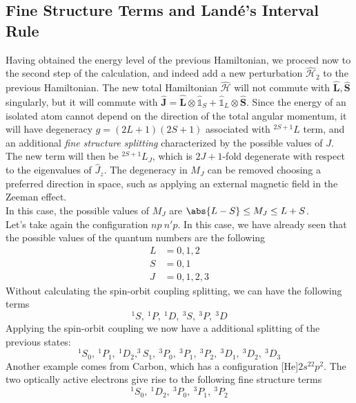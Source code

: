 \documentclass[a4paper, 11pt]{book}
\renewcommand{\vec}[1]{\mathbf{#1}}
\newcommand{\1}{\opr{\mathds{1}}}
\newcommand{\ham}{\mathcal{H}}
\newcommand{\opr}[1]{\hat{#1}}
\newcommand{\vecopr}[1]{\opr{\vec{#1}}}
\newcommand{\term}[3][]{^{#3}#2_{#1}}
\theoremstyle{plain}
\begin{document}
	\subsection{Fine Structure Terms and Landé's Interval Rule}
	Having obtained the energy level of the previous Hamiltonian, we proceed now to the second step of the calculation, and indeed add a new perturbation $\opr{\ham}_2$ to the previous Hamiltonian. The new total Hamiltonian $\opr{\ham}$ will not commute with $\vecopr{L},\vecopr{S}$ singularly, but it will commute with $\vecopr{J}=\vecopr{L}\otimes\1_S+\1_L\otimes\vecopr{S}$. Since the energy of an isolated atom cannot depend on the direction of the total angular momentum, it will have degeneracy $g=(2L+1)(2S+1)$ associated with $^{2S+1}L$ term, and an additional \textit{fine structure splitting} characterized by the possible values of $J$. The new term will then be $^{2S+1}L_J$, which is $2J+1$-fold degenerate with respect to the eigenvalues of $\opr{J}_z$. The degeneracy in $M_J$ can be removed choosing a preferred direction in space, such as applying an external magnetic field in the Zeeman effect.\\
	In this case, the possible values of $M_J$ are $\abs{L-S}\le M_J\le L+S$.\\
	Let's take again the configuration $np\ n'p$. In this case, we have already seen that the possible values of the quantum numbers are the following
	\begin{equation}
		\begin{aligned}
			L&=0,1,2\\
			S&=0,1\\
			J&=0,1,2,3
		\end{aligned}
		\label{eq:npnprimepconf}
	\end{equation}
	Without calculating the spin-orbit coupling splitting, we can have the following terms
	\begin{equation*}
		^1S,\ ^1P,\ ^1D,\ ^3S,\ ^3P,\ ^3D
	\end{equation*}
	Applying the spin-orbit coupling we now have a additional splitting of the previous states:
	\begin{equation*}
		\term[0]{S}{1},\ \term[1]{P}{1},\ \term[2]{D}{1},\term[1]{S}{3},\ \term[0]{P}{3},\ \term[1]{P}{3},\ \term[2]{P}{3},\ \term[1]{D}{3},\ \term[2]{D}{3},\ \term[3]{D}{3}
	\end{equation*}
	Another example comes from Carbon, which has a configuration [He]$2s^22p^2$. The two optically active electrons give rise to the following fine structure terms
	\begin{equation*}
		\term[0]{S}{1},\ \term[2]{D}{1},\ \term[0]{P}{3},\ \term[1]{P}{3},\ \term[2]{P}{3}
	\end{equation*}
\end{document}
